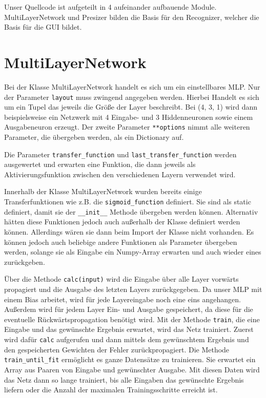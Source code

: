 \documentclass[10pt,a4paper,ngerman,oneside]{scrartcl}
\title{\trtitle}
\author{\trauthor}
\date{\today}
\begin{document}
	\maketitle
	\pagebreak

	\noindent
	Unser Quellcode ist aufgeteilt in 4 aufeinander aufbauende Module. MultiLayerNetwork und Presizer bilden die 
	Basis für den Recognizer, welcher die Basis für die GUI bildet.
	
	\section{MultiLayerNetwork}
		Bei der Klasse MultiLayerNetwork handelt es sich um ein einstellbares MLP. 
		Nur der Parameter \texttt{layout} muss zwingend angegeben werden. Hierbei Handelt es sich 
		um ein Tupel das jeweils die Größe der Layer beschreibt. Bei (4, 3, 1) wird
		dann beispielsweise ein Netzwerk mit 4 Eingabe- und 3 Hiddenneuronen sowie einem Ausgabeneuron 
		erzeugt. Der zweite Parameter \texttt{**options} nimmt alle weiteren Parameter, die übergeben
		werden, als ein Dictionary auf. 

		Die Parameter \texttt{transfer\_function} und \texttt{last\_transfer\_function} werden ausgewertet und erwarten eine
		Funktion, die dann jeweils als Aktivierungsfunktion zwischen den verschiedenen Layern verwendet wird.
		
		Innerhalb der Klasse MultiLayerNetwork wurden bereits einige Transferfunktionen wie z.B. die \texttt{sigmoid\_function} definiert.
		Sie sind als static definiert, damit sie der \texttt{\_\_init\_\_} Methode übergeben werden können. Alternativ hätten diese
		Funktionen jedoch auch außerhalb der Klasse definiert werden können. Allerdings wären sie dann beim Import der Klasse nicht
		vorhanden. Es können jedoch auch beliebige andere Funktionen als Parameter übergeben werden, solange sie als Eingabe ein Numpy-Array
		erwarten und auch wieder eines zurückgeben.

		Über die Methode \texttt{calc(input)} wird die Eingabe über alle Layer vorwärts propagiert und die Ausgabe des letzten Layers 
		zurückgegeben. Da unser MLP mit einem Bias arbeitet, wird für jede Layereingabe noch eine eins angehangen.
		Außerdem wird für jedem Layer Ein- und Ausgabe gespeichert, da diese für die eventuelle Rückwärtspropagation benötigt wird.
		Mit der Methode \texttt{train}, die eine Eingabe und das gewünschte Ergebnis erwartet, wird das Netz trainiert.
		Zuerst wird dafür \texttt{calc} aufgerufen und dann mittels dem gewünschtem Ergebnis und den gespeicherten Gewichten der
		Fehler zurückpropagiert. 
		Die Methode \texttt{train\_until\_fit} ermöglicht es ganze Datensätze zu trainieren. Sie erwartet ein Array aus 
		Paaren von Eingabe und gewünschter Ausgabe. Mit diesen Daten wird das Netz dann so lange trainiert, bis alle
		Eingaben das gewünschte Ergebnis liefern oder die Anzahl der maximalen Trainingsschritte erreicht ist. 
\end{document}
